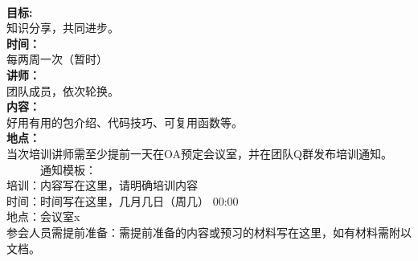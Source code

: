 \documentclass[]{book}
\begin{document}
\\
\textbf{目标:}\\
\hspace*{0.333em}\hspace*{0.333em}\hspace*{0.333em}\hspace*{0.333em}\hspace*{0.333em}\hspace*{0.333em}知识分享，共同进步。\\
\textbf{时间：}\\
\hspace*{0.333em}\hspace*{0.333em}\hspace*{0.333em}\hspace*{0.333em}\hspace*{0.333em}\hspace*{0.333em}每两周一次（暂时）\\
\textbf{讲师：}\\
\hspace*{0.333em}\hspace*{0.333em}\hspace*{0.333em}\hspace*{0.333em}\hspace*{0.333em}\hspace*{0.333em}团队成员，依次轮换。\\
\textbf{内容： }\\
\hspace*{0.333em}\hspace*{0.333em}\hspace*{0.333em}\hspace*{0.333em}\hspace*{0.333em}\hspace*{0.333em}好用有用的包介绍、代码技巧、可复用函数等。\\
\textbf{地点：}\\
\hspace*{0.333em}\hspace*{0.333em}\hspace*{0.333em}\hspace*{0.333em}\hspace*{0.333em}\hspace*{0.333em}当次培训讲师需至少提前一天在OA预定会议室，并在团队Q群发布培训通知。\\
~~~~~~通知模板：\\
培训：内容写在这里，请明确培训内容\\
时间：时间写在这里，几月几日（周几） 00:00\\
地点：会议室x\\
参会人员需提前准备：需提前准备的内容或预习的材料写在这里，如有材料需附以文档。
\end{document}
